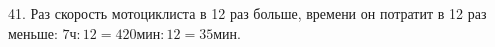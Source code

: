 41. Раз скорость мотоциклиста в 12 раз больше, времени он потратит в 12 раз меньше: $7\text{ч}:12=420\text{мин}:12=35$мин.\\

